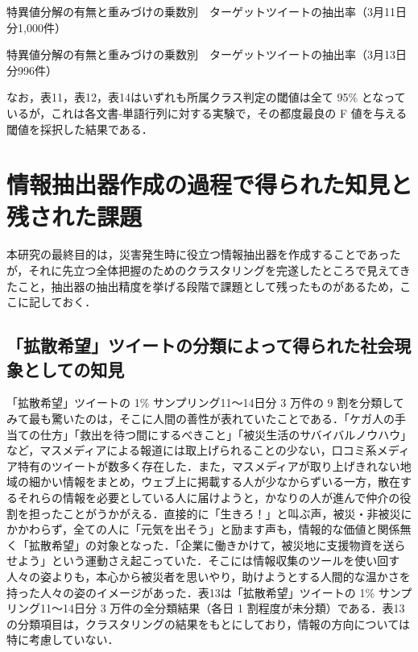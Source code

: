 \documentclass[japanese]{jnlp_1.4}
\begin{document}
\begin{table}[t]
\caption{特異値分解の有無と重みづけの乗数別　ターゲットツイートの抽出率（3月11日分1,000件）}

\end{table}
\begin{table}[t]
\caption{特異値分解の有無と重みづけの乗数別　ターゲットツイートの抽出率（3月13日分996件）}

\end{table}

なお，表11，表12，表14はいずれも所属クラス判定の閾値は全て 95\% となっているが，これは各文書‐単語行列に対する実験で，その都度最良の F 値を与える閾値を採択した結果である．



\section{情報抽出器作成の過程で得られた知見と残された課題}

本研究の最終目的は，災害発生時に役立つ情報抽出器を作成することであったが，それに先立つ全体把握のためのクラスタリングを完遂したところで見えてきたこと，抽出器の抽出精度を挙げる段階で課題として残ったものがあるため，ここに記しておく．



\subsection{「拡散希望」ツイートの分類によって得られた社会現象としての知見}

「拡散希望」ツイートの 1\% サンプリング11〜14日分 3 万件の 9 割を分類してみて最も驚いたのは，そこに人間の善性が表れていたことである．「ケガ人の手当ての仕方」「救出を待つ間にするべきこと」「被災生活のサバイバルノウハウ」など，マスメディアによる報道には取上げられることの少ない，口コミ系メディア特有のツイートが数多く存在した．また，マスメディアが取り上げきれない地域の細かい情報をまとめ，ウェブ上に掲載する人が少なからずいる一方，散在するそれらの情報を必要としている人に届けようと，かなりの人が進んで仲介の役割を担ったことがうかがえる．直接的に「生きろ！」と叫ぶ声，被災・非被災にかかわらず，全ての人に「元気を出そう」と励ます声も，情報的な価値と関係無く「拡散希望」の対象となった．「企業に働きかけて，被災地に支援物資を送らせよう」という運動さえ起こっていた．そこには情報収集のツールを使い回す人々の姿よりも，本心から被災者を思いやり，助けようとする人間的な温かさを持った人々の姿のイメージがあった．表13は「拡散希望」ツイートの 1\% サンプリング11〜14日分 3 万件の全分類結果（各日 1 割程度が未分類）である．表13の分類項目は，クラスタリングの結果をもとにしており，情報の方向については特に考慮していない．
\end{document}
